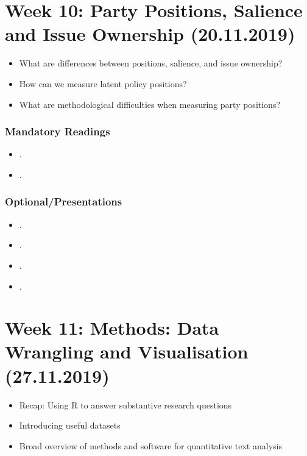 \documentclass[abstract=on,parskip=full,headings=standardclasses,fontsize=11pt,paper=a4]{scrartcl}
\begin{document}
\section{Week 10:   Party Positions, Salience and Issue Ownership (20.11.2019)}


\begin{itemize}
\renewcommand\labelitemi{--}
\item What are differences between positions, salience, and issue ownership?
\item How can we measure latent policy positions? 
\item What are methodological difficulties when measuring party positions?
\end{itemize}

\subsubsection*{Mandatory Readings}
\begin{itemize}
\item {}.
\item {}.
\end{itemize}


\subsubsection*{Optional/Presentations}
\begin{itemize}
\item {}.
\item {}.
\item {}.
\item {}.
\end{itemize}



\section{Week 11: Methods: Data Wrangling and Visualisation (27.11.2019)}


\begin{itemize}
\renewcommand\labelitemi{--}
\item Recap: Using \textsf{R} to answer substantive research questions
\item Introducing  useful datasets
\item Broad overview of methods and software for quantitative text analysis
\end{itemize}
\end{document}
